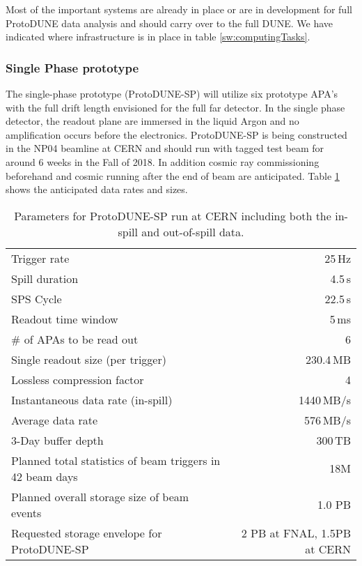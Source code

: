 Most of the important systems are already in place or are in development for full ProtoDUNE data analysis and should carry over to the full DUNE.
We have indicated where infrastructure is in place in  table  \ref{sw:computingTasks}.




\subsubsection{Single Phase prototype}

The single-phase prototype (ProtoDUNE-SP) will utilize six prototype APA's with the full drift length envisioned for the full far detector. In the single phase detector, the readout plane are immersed in the liquid Argon and no amplification occurs before the electronics.    ProtoDUNE-SP is being constructed in the NP04 beamline at CERN and should run with tagged test beam for around 6 weeks in the Fall of 2018.  In addition cosmic ray commissioning beforehand and cosmic running after the end of beam are anticipated.  Table \ref{tab:np04_data_rate}
shows the anticipated data rates and sizes. 



\begin{table}[htbp]
  \centering
  \begin{tabular}[h]{l|r}
\hline
    Trigger rate & 25\,Hz \\
    Spill duration & 4.5\,s\\
    SPS Cycle & 22.5\,s \\
    Readout time window & 5\,ms \\
    \# of APAs to be read out & 6 \\
    \hline
    Single readout size (per trigger) & 230.4\,MB \\
    Lossless compression factor & 4 \\
    Instantaneous data rate (in-spill) & 1440\,MB/s \\
    Average data rate & 576\,MB/s \\
    \hline
    3-Day buffer depth & 300\,TB \\
    Planned total statistics of beam triggers in 42 beam days &18M\\
    Planned overall storage size of beam events&   1.0 PB\\
   Requested storage envelope for ProtoDUNE-SP&2 PB at FNAL, 1.5PB at CERN \\
    \hline
  \end{tabular}
  \caption{Parameters for ProtoDUNE-SP run at CERN including both
  the in-spill and out-of-spill data.  }
  \label{tab:np04_data_rate}
\end{table}
